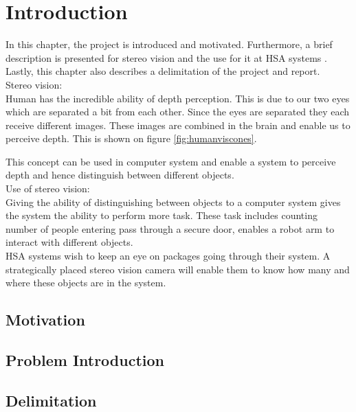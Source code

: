 \chapter{Introduction}\label{ch:introduction}
In this chapter, the project is introduced and motivated. Furthermore, a brief description is presented for stereo vision and the use for it at HSA systems . Lastly, this chapter also describes a delimitation of the project and report.\\

Stereo vision:\\
Human has the incredible ability of depth perception. This is due to our two eyes which are separated a bit from each other. Since the eyes are separated they each receive different images. These images are combined in the brain and enable us to perceive depth. This is shown on figure \ref{fig:humanviscones}. 


This concept can be used in computer system and enable a system to perceive depth and hence distinguish between different objects.\\

Use of stereo vision:\\
Giving the ability of distinguishing between objects to a computer system gives the system the ability to perform more task. These task includes counting number of people entering pass through a secure door, enables a robot arm to interact with different objects.\\

HSA systems wish to keep an eye on packages going through their system. A strategically placed stereo vision camera will enable them to know how many and where these objects are in the system. 

\section{Motivation}

\section{Problem Introduction}

\section{Delimitation}


